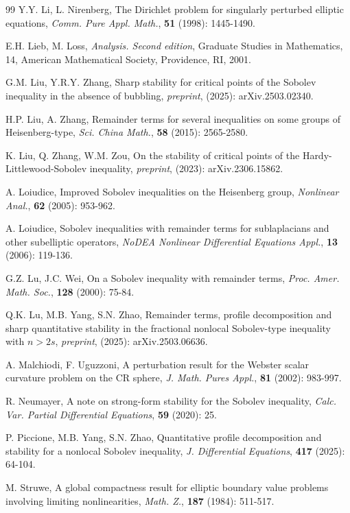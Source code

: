\documentclass[11pt]{article}
\begin{document}
\begin{thebibliography}{99}
 Y.Y. Li, L. Nirenberg,
The Dirichlet problem for singularly perturbed elliptic equations, {\em Comm. Pure Appl. Math.}, {\bf 51} (1998): 1445-1490.

  E.H. Lieb, M. Loss,
{\em Analysis. Second edition}, Graduate Studies in Mathematics, 14, American Mathematical Society,
 Providence, RI, 2001.

 G.M. Liu, Y.R.Y. Zhang,
Sharp stability for critical points of the Sobolev inequality in the absence of bubbling,
{\em preprint}, (2025): arXiv.2503.02340.

 H.P. Liu, A. Zhang,
Remainder terms for several inequalities on some groups of Heisenberg-type,
{\em Sci. China Math.}, {\bf 58} (2015): 2565-2580.

K. Liu, Q. Zhang, W.M. Zou,
On the stability of critical points of the Hardy-Littlewood-Sobolev inequality,
{\em preprint}, (2023): arXiv.2306.15862.

 A. Loiudice,
Improved Sobolev inequalities on the Heisenberg group,
{\em Nonlinear Anal.},
{\bf 62} (2005): 953-962.

 A. Loiudice,
Sobolev inequalities with remainder terms for sublaplacians and other subelliptic operators,
{\em NoDEA Nonlinear Differential Equations Appl.}, {\bf 13} (2006): 119-136.

G.Z. Lu, J.C. Wei,  On a Sobolev inequality with remainder terms, {\em Proc. Amer. Math. Soc.}, \textbf{128} (2000): 75-84.


 Q.K. Lu, M.B. Yang, S.N. Zhao,
Remainder terms, profile decomposition and sharp quantitative stability in the fractional
nonlocal Sobolev-type inequality with $n > 2s$, {\em preprint}, (2025): arXiv.2503.06636.

 A. Malchiodi, F. Uguzzoni,
A perturbation result for the Webster scalar curvature problem on the CR sphere,
{\em J. Math. Pures Appl.}, {\bf 81} (2002): 983-997.

 R. Neumayer,
A note on strong-form stability for the Sobolev inequality,
{\em Calc. Var. Partial Differential Equations}, {\bf 59} (2020): 25.


 P. Piccione, M.B. Yang, S.N. Zhao,
Quantitative profile decomposition and stability for a nonlocal Sobolev inequality,
{\em J. Differential Equations}, {\bf 417} (2025): 64-104.

 M. Struwe,
A global compactness result for elliptic boundary value problems involving limiting nonlinearities, {\em Math. Z.}, {\bf 187}
(1984): 511-517.


\end{thebibliography}
\end{document}
